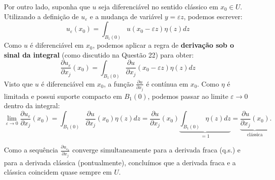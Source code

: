 \documentclass[cs_edp_2026.1.tex]{subfiles} %
\begin{document}
\begin{prova}
	Por outro lado, suponha que $u$ seja diferenciável no sentido clássico em $x_0 \in U$. Utilizando a definição de $u_\varepsilon$ e a mudança de variável $y = \varepsilon z$, podemos escrever:
	$$u_\varepsilon(x_0) = \int_{B_1(0)} u(x_0 - \varepsilon z) \eta(z) dz$$
	Como $u$ é diferenciável em $x_0$, podemos aplicar a regra de \textbf{derivação sob o sinal da integral} (como discutido na Questão 22) para obter:
	$$\frac{\partial u_\varepsilon}{\partial x_j}(x_0) = \int_{B_1(0)} \frac{\partial u}{\partial x_j}(x_0 - \varepsilon z) \eta(z) dz$$
	Visto que $u$ é diferenciável em $x_0$, a função $\frac{\partial u}{\partial x_j}$ é contínua em $x_0$. Como $\eta$ é limitada e possui suporte compacto em $B_1(0)$, podemos passar ao limite $\varepsilon \to 0$ dentro da integral:
	$$\lim_{\varepsilon \to 0} \frac{\partial u_\varepsilon}{\partial x_j}(x_0) = \int_{B_1(0)} \frac{\partial u}{\partial x_j}(x_0) \eta(z) dz = \frac{\partial u}{\partial x_j}(x_0) \underbrace{\int_{B_1(0)} \eta(z) dz}_{=1}=\underbrace{\frac{\partial u}{\partial x_j}(x_0)}_{\text{clássica}}.$$
	
	Como a sequência $\tfrac{\partial u_{\varepsilon_k}}{\partial x_j}$ converge simultaneamente para a derivada fraca (q.s.) e para a derivada clássica (pontualmente), concluímos que a derivada fraca e a clássica coincidem quase sempre em $U$.
\end{prova}

\end{document}
